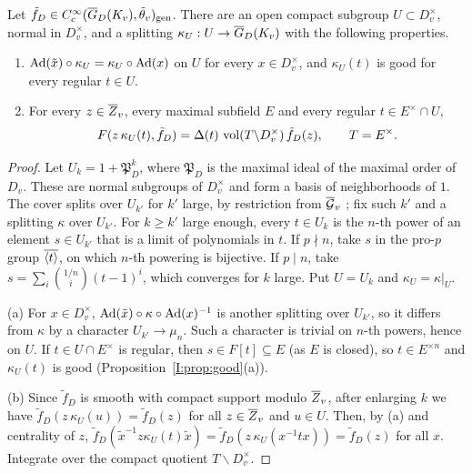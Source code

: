 \begin{proposition}\label{I:prop:germ}
Let $\tilde f_D\in C_c^\infty(\overline{G}_D(K_v),\tilde\theta_v)_{\mathrm{gen}}$. There are an open compact subgroup $U\subset D_v^\times$, normal in $D_v^\times$, and a splitting $\kappa_U:U\to\overline{G}_D(K_v)$ with the following properties.
\begin{enumerate}[label=(\alph*)]
\item $\operatorname{Ad}(\tilde x)\circ\kappa_U=\kappa_U\circ\operatorname{Ad}(x)$ on $U$ for every $x\in D_v^\times$, and $\kappa_U(t)$ is good for every regular $t\in U$.
\item For every $z\in\overline{Z}_v$, every maximal subfield $E$ and every regular $t\in E^\times\cap U$,
\[ F(z\,\kappa_U(t),\tilde f_D)=\Delta(t)\,\operatorname{vol}(T\backslash D_v^\times)\,\tilde f_D(z),\qquad T=E^\times. \]
\end{enumerate}
\end{proposition}
\begin{proof}
Let $U_k=1+\mathfrak P_D^k$, where $\mathfrak P_D$ is the maximal ideal of the maximal order of $D_v$. These are normal subgroups of $D_v^\times$ and form a basis of neighborhoods of $1$. The cover splits over $U_{k'}$ for $k'$ large, by restriction from $\overline{\mathcal{G}}_v$ \cite[\S2]{FK86}; fix such $k'$ and a splitting $\kappa$ over $U_{k'}$. For $k\ge k'$ large enough, every $t\in U_k$ is the $n$-th power of an element $s\in U_{k'}$ that is a limit of polynomials in $t$. If $p\nmid n$, take $s$ in the pro-$p$ group $\overline{\langle t\rangle}$, on which $n$-th powering is bijective. If $p\mid n$, take $s=\sum_i\binom{1/n}{i}(t-1)^i$, which converges for $k$ large. Put $U=U_k$ and $\kappa_U=\kappa|_U$.

(a) For $x\in D_v^\times$, $\operatorname{Ad}(\tilde x)\circ\kappa\circ\operatorname{Ad}(x)^{-1}$ is another splitting over $U_{k'}$, so it differs from $\kappa$ by a character $U_{k'}\to\mu_n$. Such a character is trivial on $n$-th powers, hence on $U$. If $t\in U\cap E^\times$ is regular, then $s\in F[t]\subseteq E$ (as $E$ is closed), so $t\in E^{\times n}$ and $\kappa_U(t)$ is good (Proposition~\ref{I:prop:good}(a)).

(b) Since $\tilde f_D$ is smooth with compact support modulo $\overline{Z}_v$, after enlarging $k$ we have $\tilde f_D(z\,\kappa_U(u))=\tilde f_D(z)$ for all $z\in\overline{Z}_v$ and $u\in U$. Then, by (a) and centrality of $z$, $\tilde f_D(\tilde x^{-1}z\kappa_U(t)\tilde x)=\tilde f_D(z\,\kappa_U(x^{-1}tx))=\tilde f_D(z)$ for all $x$. Integrate over the compact quotient $T\backslash D_v^\times$.
\end{proof}

